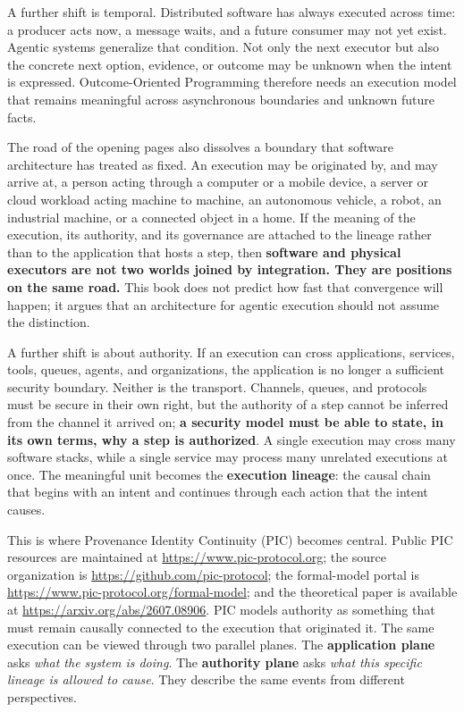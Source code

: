 \documentclass[10pt,oneside,openany]{book}
\newcommand{\term}[1]{\textbf{#1}}
\begin{document}
A further shift is temporal. Distributed software has always executed across time: a producer acts now, a message waits, and a future consumer may not yet exist. Agentic systems generalize that condition. Not only the next executor but also the concrete next option, evidence, or outcome may be unknown when the intent is expressed. Outcome-Oriented Programming therefore needs an execution model that remains meaningful across asynchronous boundaries and unknown future facts.

The road of the opening pages also dissolves a boundary that software architecture has treated as fixed. An execution may be originated by, and may arrive at, a person acting through a computer or a mobile device, a server or cloud workload acting machine to machine, an autonomous vehicle, a robot, an industrial machine, or a connected object in a home. If the meaning of the execution, its authority, and its governance are attached to the lineage rather than to the application that hosts a step, then \textbf{software and physical executors are not two worlds joined by integration. They are positions on the same road.} This book does not predict how fast that convergence will happen; it argues that an architecture for agentic execution should not assume the distinction.

A further shift is about authority. If an execution can cross applications, services, tools, queues, agents, and organizations, the application is no longer a sufficient security boundary. Neither is the transport. Channels, queues, and protocols must be secure in their own right, but the authority of a step cannot be inferred from the channel it arrived on; \textbf{a security model must be able to state, in its own terms, why a step is authorized}. A single execution may cross many software stacks, while a single service may process many unrelated executions at once. The meaningful unit becomes the \term{execution lineage}: the causal chain that begins with an intent and continues through each action that the intent causes.

This is where Provenance Identity Continuity (PIC) becomes central. Public PIC resources are maintained at \url{https://www.pic-protocol.org}; the source organization is \url{https://github.com/pic-protocol}; the formal-model portal is \url{https://www.pic-protocol.org/formal-model}; and the theoretical paper is available at \url{https://arxiv.org/abs/2607.08906}. PIC models authority as something that must remain causally connected to the execution that originated it. The same execution can be viewed through two parallel planes. The \term{application plane} asks \emph{what the system is doing}. The \term{authority plane} asks \emph{what this specific lineage is allowed to cause}. They describe the same events from different perspectives.
\end{document}
